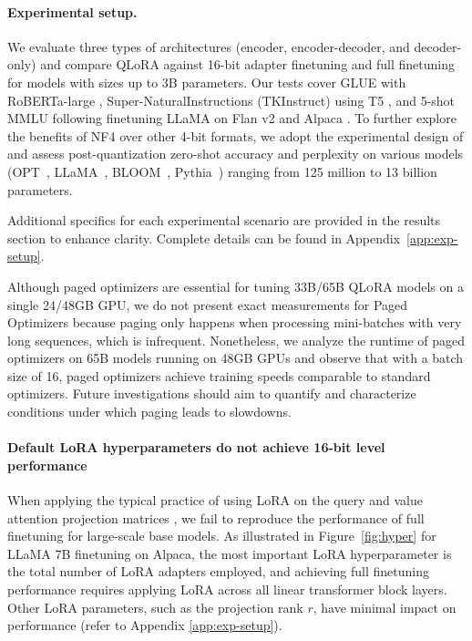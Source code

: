 \paragraph{Experimental setup.} We evaluate three types of architectures (encoder, encoder-decoder, and decoder-only) and compare QLoRA against 16-bit adapter finetuning and full finetuning for models with sizes up to 3B parameters. Our tests cover GLUE \citep{wang2018glue} with RoBERTa-large \citep{liu2019roberta}, Super-NaturalInstructions (TKInstruct) \citep{wang2022super} using T5 \citep{t5}, and 5-shot MMLU \citep{hendrycksmeasuring} following finetuning LLaMA on Flan v2 \citep{longpre2023flan} and Alpaca \citep{alpaca}. To further explore the benefits of NF4 over other 4-bit formats, we adopt the experimental design of \citet{dettmers2022case} and assess post-quantization zero-shot accuracy and perplexity on various models (OPT~\citep{zhang2022opt}, LLaMA~\citep{touvron2023llama}, BLOOM~\citep{scao2022bloom}, Pythia~\citep{biderman2023pythia}) ranging from 125 million to 13 billion parameters.

Additional specifics for each experimental scenario are provided in the results section to enhance clarity. Complete details can be found in Appendix~\ref{app:exp-setup}.

Although paged optimizers are essential for tuning 33B/65B \textsc{QLoRA} models on a single 24/48GB GPU, we do not present exact measurements for Paged Optimizers because paging only happens when processing mini-batches with very long sequences, which is infrequent. Nonetheless, we analyze the runtime of paged optimizers on 65B models running on 48GB GPUs and observe that with a batch size of 16, paged optimizers achieve training speeds comparable to standard optimizers. Future investigations should aim to quantify and characterize conditions under which paging leads to slowdowns.

\paragraph{Default LoRA hyperparameters do not achieve 16-bit level performance}

When applying the typical practice of using LoRA on the query and value attention projection matrices \citep{hu2021lora}, we fail to reproduce the performance of full finetuning for large-scale base models. As illustrated in Figure~\ref{fig:hyper} for LLaMA 7B finetuning on Alpaca, the most important LoRA hyperparameter is the total number of LoRA adapters employed, and achieving full finetuning performance requires applying LoRA across all linear transformer block layers. Other LoRA parameters, such as the projection rank $r$, have minimal impact on performance (refer to Appendix \ref{app:exp-setup}).


